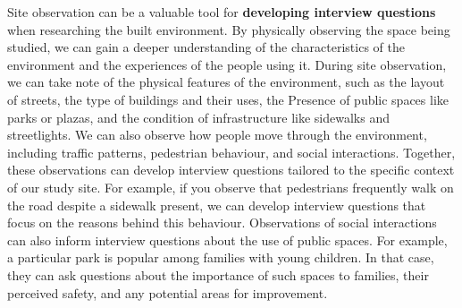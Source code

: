 \documentclass[
]{latex/krantz}
\begin{document}
Site observation can be a valuable tool for \textbf{developing interview questions} when researching the built environment. By physically observing the space being studied, we can gain a deeper understanding of the characteristics of the environment and the experiences of the people using it. During site observation, we can take note of the physical features of the environment, such as the layout of streets, the type of buildings and their uses, the Presence of public spaces like parks or plazas, and the condition of infrastructure like sidewalks and streetlights. We can also observe how people move through the environment, including traffic patterns, pedestrian behaviour, and social interactions. Together, these observations can develop interview questions tailored to the specific context of our study site. For example, if you observe that pedestrians frequently walk on the road despite a sidewalk present, we can develop interview questions that focus on the reasons behind this behaviour. Observations of social interactions can also inform interview questions about the use of public spaces. For example, a particular park is popular among families with young children. In that case, they can ask questions about the importance of such spaces to families, their perceived safety, and any potential areas for improvement.
\end{document}
